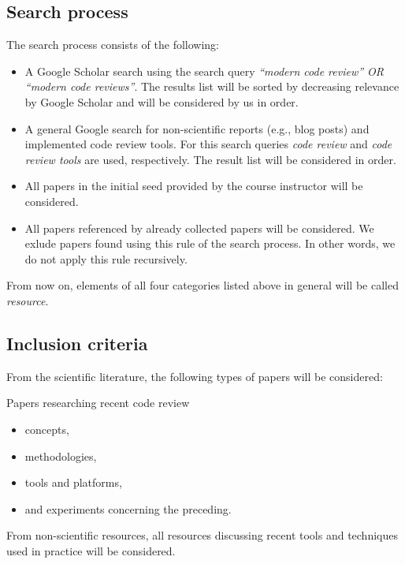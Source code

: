 \documentclass[]{book}
\providecommand{\tightlist}{%
  \setlength{\itemsep}{0pt}\setlength{\parskip}{0pt}}
\begin{document}
\subsection{Search process}\label{search-process}

The search process consists of the following:

\begin{itemize}
\tightlist
\item
  A Google Scholar search using the search query \emph{``modern code
  review'' OR ``modern code reviews''}. The results list will be sorted
  by decreasing relevance by Google Scholar and will be considered by us
  in order.
\item
  A general Google search for non-scientific reports (e.g., blog posts)
  and implemented code review tools. For this search queries \emph{code
  review} and \emph{code review tools} are used, respectively. The
  result list will be considered in order.
\item
  All papers in the initial seed provided by the course instructor will
  be considered.
\item
  All papers referenced by already collected papers will be considered.
  We exlude papers found using this rule of the search process. In other
  words, we do not apply this rule recursively.
\end{itemize}

From now on, elements of all four categories listed above in general
will be called \emph{resource}.

\subsection{Inclusion criteria}\label{inclusion-criteria}

From the scientific literature, the following types of papers will be
considered:

Papers researching recent code review

\begin{itemize}
\tightlist
\item
  concepts,
\item
  methodologies,
\item
  tools and platforms,
\item
  and experiments concerning the preceding.
\end{itemize}

From non-scientific resources, all resources discussing recent tools and
techniques used in practice will be considered.
\end{document}
